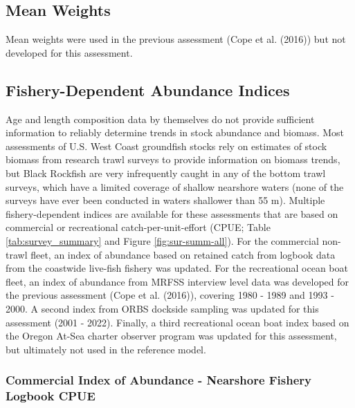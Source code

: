 \documentclass[11pt,
  letterpaper,
]{article}
\begin{document}
\hypertarget{mean-weights}{%
\subsection{Mean Weights}\label{mean-weights}}

Mean weights were used in the previous assessment (Cope et al. (2016)) but not developed for this assessment.

\hypertarget{fishery-dependent-abundance-indices}{%
\subsection{Fishery-Dependent Abundance Indices}\label{fishery-dependent-abundance-indices}}

Age and length composition data by themselves do not provide sufficient information to reliably determine trends in stock abundance and biomass. Most assessments of U.S. West Coast groundfish stocks rely on estimates of stock biomass from research trawl surveys to provide information on biomass trends, but Black Rockfish are very infrequently caught in any of the bottom trawl surveys, which have a limited coverage of shallow nearshore waters (none of the surveys have ever been conducted in waters shallower than 55 m). Multiple fishery-dependent indices are available for these assessments that are based on commercial or recreational catch-per-unit-effort (CPUE; Table \ref{tab:survey_summary} and Figure \ref{fig:sur-summ-all}). For the commercial non-trawl fleet, an index of abundance based on retained catch from logbook data from the coastwide live-fish fishery was updated. For the recreational ocean boat fleet, an index of abundance from MRFSS interview level data was developed for the previous assessment (Cope et al. (2016)), covering 1980 - 1989 and 1993 - 2000. A second index from ORBS dockside sampling was updated for this assessment (2001 - 2022). Finally, a third recreational ocean boat index based on the Oregon At-Sea charter observer program was updated for this assessment, but ultimately not used in the reference model.

\hypertarget{commercial-index-of-abundance---nearshore-fishery-logbook-cpue}{%
\subsubsection{Commercial Index of Abundance - Nearshore Fishery Logbook CPUE}\label{commercial-index-of-abundance---nearshore-fishery-logbook-cpue}}
\end{document}
